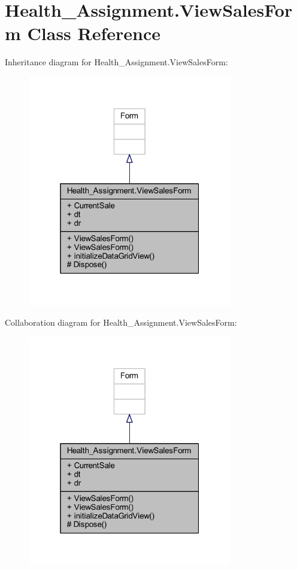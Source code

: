 \hypertarget{class_health___assignment_1_1_view_sales_form}{}\section{Health\+\_\+\+Assignment.\+View\+Sales\+Form Class Reference}
\label{class_health___assignment_1_1_view_sales_form}


Inheritance diagram for Health\+\_\+\+Assignment.\+View\+Sales\+Form\+:\nopagebreak
\begin{figure}[H]
\begin{center}
\leavevmode
\includegraphics[width=253pt]{class_health___assignment_1_1_view_sales_form__inherit__graph}
\end{center}
\end{figure}


Collaboration diagram for Health\+\_\+\+Assignment.\+View\+Sales\+Form\+:\nopagebreak
\begin{figure}[H]
\begin{center}
\leavevmode
\includegraphics[width=253pt]{class_health___assignment_1_1_view_sales_form__coll__graph}
\end{center}
\end{figure}
